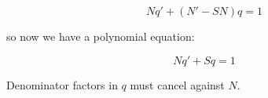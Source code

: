$$N q' + (N' - SN) q = 1$$

so now we have a polynomial equation:

$$N q' + S q = 1$$

Denominator factors in $q$ must cancel against $N$.

\vfill \eject

\begin{comment}
$$A T F^{a+t} r' - S F^s r = C T F^{c+t}$$

$$A T F^{a+t} \frac{N' F^m D - N(m F^{m-1} D + F^m D')}{F^{2m} D^2} - S F^s \frac{N}{F^m D} = C T F^{c+t}$$

$$A T F^{a+t} \frac{N' F D - N(m D + F D')}{F^{m+1} D^2} - S F^s \frac{N}{F^m D} = C T F^{c+t}$$


$$A T F^{a+t} (N' F D - m N D - N F D') - S N F^{s+1} D = C T D^2 F^{c+t+m+1}$$

$$A T F^{a+t+1} (N' D - N D') - m A T F^{a+t} N D - S N F^{s+1} D = C T D^2 F^{c+t+m+1}$$

$$A f^a (n' f d - n(m d + f d')) - B f^{b+1} n d = A C d^2 f^{a+c+m+1} $$

$$A f^a (n' f d - m n d - f n d') - B f^{b+1} n d = A C d^2 f^{a+c+m+1} $$

$$A n' d f^{a+1} - m A n d f^a - A n d' f^{a+1} - B n d f^{b+1} = A C d^2 f^{a+c+m+1} $$
\end{comment}

\begin{comment}
$$A F^{a} r' - B F^b r = C F^{c}$$


$$A F^{a} \frac{N' F D - m N F' D - N F D'}{F^{m+1} D^2} - B F^b \frac{N}{F^m D} = C F^{c}$$

$$A F^{a} (N' F D - m N F' D - N F D') - B N F^{b+1} D = C D^2 F^{c+m+1}$$

$$A F^{a+1} (N' D - N D') - m A F^{a} F' N D - B N F^{b+1} D = C D^2 F^{c+m+1}$$
\end{comment}

\begin{comment}
$$A F^{a} r' - B r = A F^{a}$$

$$A F^{a} \frac{N' F D - m N F' D - N F D'}{F^{m+1} D^2} - B \frac{N}{F^m D} = A F^{a}$$

$$A F^{a} (N' F D - m N F' D - N F D') - B N F D = A D^2 F^{a+m+1}$$

$$A (N' D - N D') F^{a+1} - m A F' N D F^{a} - B N D F = A D^2 F^{a+m+1}$$

$$A (N' D - N D') F^{a} - m A F' N D F^{a-1} - B N D = A D^2 F^{a+m}$$

$$A D^2 F^{a+m} - A (N' D - N D') F^{a} + m A F' N D F^{a-1} = B N D $$
\end{comment}



